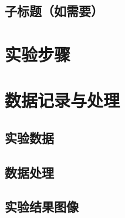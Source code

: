 ﻿\documentclass[12pt,a4paper]{article}
\begin{document}
\subsection{子标题（如需要）}


\section{实验步骤}


\section{数据记录与处理}


\subsection{实验数据}


\subsection{数据处理}


\subsection{实验结果图像}


% 
% 
\end{document}
